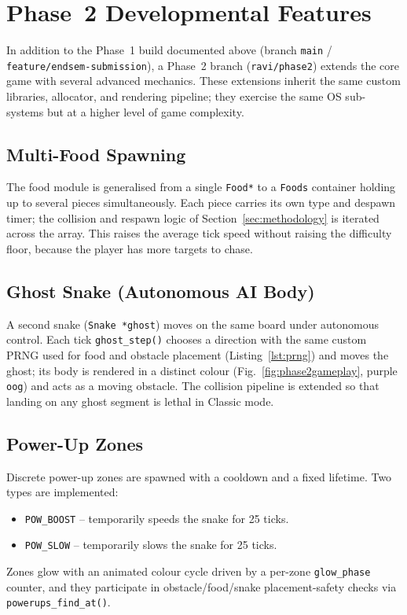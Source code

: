 \documentclass[conference]{IEEEtran}
\begin{document}
\section{Phase~2 Developmental Features}
\label{sec:phase2}

In addition to the Phase~1 build documented above (branch \texttt{main} / \texttt{feature/endsem-submission}), a Phase~2 branch (\texttt{ravi/phase2}) extends the core game with several advanced mechanics. These extensions inherit the same custom libraries, allocator, and rendering pipeline; they exercise the same OS sub-systems but at a higher level of game complexity.

\subsection{Multi-Food Spawning}
The food module is generalised from a single \texttt{Food*} to a \texttt{Foods} container holding up to several pieces simultaneously. Each piece carries its own type and despawn timer; the collision and respawn logic of Section~\ref{sec:methodology} is iterated across the array. This raises the average tick speed without raising the difficulty floor, because the player has more targets to chase.

\subsection{Ghost Snake (Autonomous AI Body)}
A second snake (\texttt{Snake *ghost}) moves on the same board under autonomous control. Each tick \texttt{ghost\_step()} chooses a direction with the same custom PRNG used for food and obstacle placement (Listing~\ref{lst:prng}) and moves the ghost; its body is rendered in a distinct colour (Fig.~\ref{fig:phase2gameplay}, purple \texttt{oog}) and acts as a moving obstacle. The collision pipeline is extended so that landing on any ghost segment is lethal in Classic mode.

\subsection{Power-Up Zones}
Discrete power-up zones are spawned with a cooldown and a fixed lifetime. Two types are implemented:
\begin{itemize}
    \item \texttt{POW\_BOOST} -- temporarily speeds the snake for 25 ticks.
    \item \texttt{POW\_SLOW} -- temporarily slows the snake for 25 ticks.
\end{itemize}
Zones glow with an animated colour cycle driven by a per-zone \texttt{glow\_phase} counter, and they participate in obstacle/food/snake placement-safety checks via \texttt{powerups\_find\_at()}.
\end{document}
